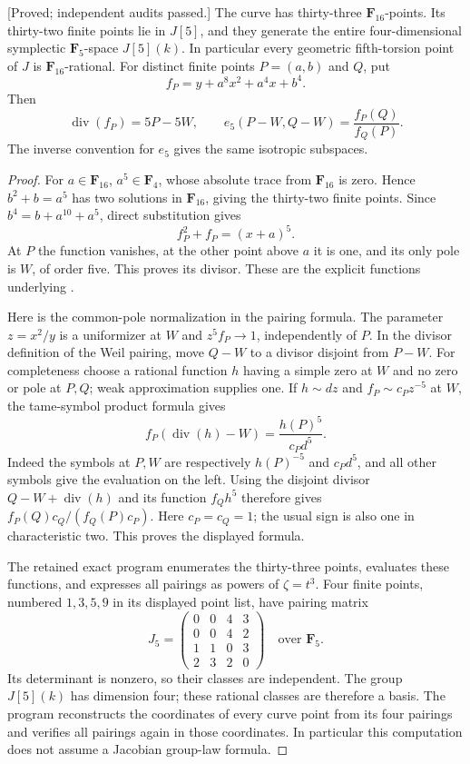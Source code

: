 \begin{lemma}
\label{lem:five-theta-explicit-Weil-candidate}
\textup{[Proved; independent audits passed.]}
The curve has thirty-three $\mathbf F_{16}$-points. Its thirty-two
finite points lie in $J[5]$, and they generate the entire four-dimensional
symplectic $\mathbf F_5$-space $J[5](k)$. In particular every geometric
fifth-torsion point of $J$ is $\mathbf F_{16}$-rational.
For distinct finite points $P=(a,b)$ and $Q$, put
\[
             f_P=y+a^8x^2+a^4x+b^4.
\]
Then
\[
 \operatorname{div}(f_P)=5P-5W,\qquad
 e_5(P-W,Q-W)=\frac{f_P(Q)}{f_Q(P)}.
\]
The inverse convention for $e_5$ gives the same isotropic subspaces.
\end{lemma}
\begin{proof}
For $a\in\mathbf F_{16}$, $a^5\in\mathbf F_4$, whose absolute trace
from $\mathbf F_{16}$ is zero. Hence $b^2+b=a^5$ has two solutions
in $\mathbf F_{16}$, giving the thirty-two finite points.
Since $b^4=b+a^{10}+a^5$, direct substitution gives
\[
                      f_P^2+f_P=(x+a)^5.
\]
At $P$ the function vanishes, at the other point above $a$ it is one,
and its only pole is $W$, of order five. This proves its divisor.
These are the explicit functions underlying
\cite[Example~1.2(ii), pp.~30--31]{BoxallGrantLeprevost2001}.

Here is the common-pole normalization in the pairing formula.
The parameter $z=x^2/y$ is a uniformizer at $W$ and
$z^5 f_P\to1$, independently of $P$. In the divisor definition of
the Weil pairing, move $Q-W$ to a divisor disjoint from $P-W$.
For completeness choose a rational function $h$ having a simple zero
at $W$ and no zero or pole at $P,Q$; weak approximation supplies one.
If $h\sim d z$ and $f_P\sim c_Pz^{-5}$ at $W$, the tame-symbol
product formula gives
\[
           f_P(\operatorname{div}(h)-W)
                   =\frac{h(P)^5}{c_Pd^5}.
\]
Indeed the symbols at $P,W$ are respectively $h(P)^{-5}$ and
$c_Pd^5$, and all other symbols give the evaluation on the left.
Using the disjoint divisor $Q-W+\operatorname{div}(h)$ and its
function $f_Qh^5$ therefore gives
$f_P(Q)c_Q/(f_Q(P)c_P)$. Here $c_P=c_Q=1$; the usual sign is also
one in characteristic two. This proves the displayed formula.

The retained exact program enumerates the thirty-three points,
evaluates these functions, and expresses all pairings as powers of
$\zeta=t^3$. Four finite points, numbered $1,3,5,9$ in its displayed
point list, have pairing matrix
\[
 J_5=\begin{pmatrix}
 0&0&4&3\\0&0&4&2\\1&1&0&3\\2&3&2&0
 \end{pmatrix}\quad\text{over }\mathbf F_5.
\]
Its determinant is nonzero, so their classes are independent.
The group $J[5](k)$ has dimension four; these rational classes are
therefore a basis. The program reconstructs the coordinates of
every curve point from its four pairings and verifies all pairings
again in those coordinates. In particular this computation does
not assume a Jacobian group-law formula.
\end{proof}

